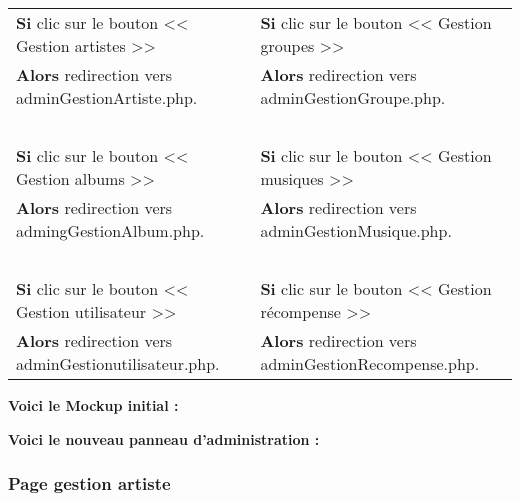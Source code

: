             \begin{center}
                \begin{tabular}{l | l}
                    \textbf{Si} clic sur le bouton << Gestion artistes >> & \textbf{Si} clic sur le bouton << Gestion groupes >> \\
                    \textbf{Alors} redirection vers adminGestionArtiste.php. & \textbf{Alors} redirection vers adminGestionGroupe.php. \\ \\
                    
                    \textbf{Si} clic sur le bouton << Gestion albums >> & \textbf{Si} clic sur le bouton << Gestion musiques >> \\
                    \textbf{Alors} redirection vers admingGestionAlbum.php. & \textbf{Alors} redirection vers adminGestionMusique.php. \\ \\
                    
                    \textbf{Si} clic sur le bouton << Gestion utilisateur >> & \textbf{Si} clic sur le bouton << Gestion récompense >> \\
                    \textbf{Alors} redirection vers adminGestionutilisateur.php. & \textbf{Alors} redirection vers adminGestionRecompense.php.
                \end{tabular}
            \end{center}

        \clearpage

            \begin{paragraphe}
                \textbf{Voici le Mockup initial :}
            \end{paragraphe}

            
            \begin{paragraphe}
                \textbf{Voici le nouveau panneau d'administration :}
            \end{paragraphe}
            
            
    \clearpage

		\subsubsection{Page gestion artiste}
        
